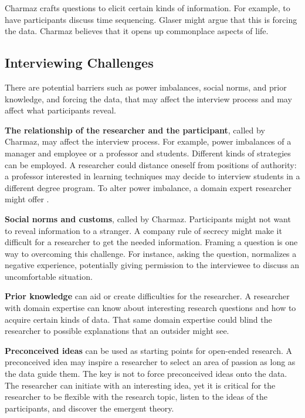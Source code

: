 Charmaz crafts questions to elicit certain kinds of information. For example,  to have participants discuss time sequencing. Glaser might argue that this is forcing the data.  Charmaz believes that it opens up commonplace aspects of life.
\subsection{Interviewing Challenges}
There are potential barriers such as power imbalances, social norms, and prior knowledge, and forcing the data, that may affect the interview process and may affect what participants reveal. 

\textbf{The relationship of the researcher and the participant}, called  by Charmaz, may affect the interview process. For example, power imbalances of a manager and employee or a professor and students.  Different kinds of strategies can be employed. A researcher could distance oneself from positions of authority: a professor interested in learning techniques may decide to interview students in a different degree program. To alter power imbalance, a domain expert researcher might offer  \cite{Charmaz}.

\textbf{Social norms and customs}, called  by Charmaz. Participants might not want to reveal information to a stranger. A company rule of secrecy might make it difficult for a researcher to get the needed information. Framing a question is one way to overcoming this challenge. For instance, asking the question,   normalizes a negative experience, potentially giving permission to the interviewee to discuss an uncomfortable situation.

\textbf{Prior knowledge} can aid or create difficulties for the researcher. A researcher with domain expertise can know about interesting research questions and how to acquire certain kinds of data. That same domain expertise could blind the researcher to possible explanations that an outsider might see.

\textbf{Preconceived ideas} can be used as starting points for open-ended research. A preconceived idea may inspire a researcher to select an area of passion as long as the data guide them. The key is not to force preconceived ideas onto the data. The researcher can initiate with an interesting idea, yet it is critical for the researcher to be flexible with the research topic, listen to the ideas of the participants, and discover the emergent theory. 

